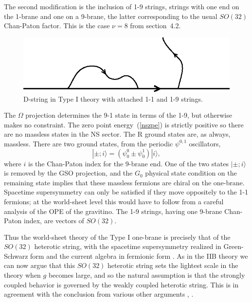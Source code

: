 \documentclass[12pt]{article}
\def\be{\begin{equation}}
\def\ee{\end{equation}}
\begin{document}
The second modification is the inclusion of 1-9 strings, strings with
one end on the 1-brane and one on a 9-brane, the latter corresponding
to the usual $SO(32)$ Chan-Paton factor.  This is the case $\nu = 8$ from
section~4.2.
\begin{figure}
\begin{center}
\leavevmode
\includegraphics{dstring.eps}
\end{center}
\caption[]{D-string in Type I theory with attached 1-1 and 1-9 strings.}
\end{figure}
The $\Omega$
projection determines the 9-1 state in terms of the 1-9, but
otherwise makes no constraint.  The zero point energy~(\ref{nszpe}) is
strictly positive so there are no massless states in the NS
sector.  The R ground states are, as always, massless.  There are two ground
states, from the periodic
$\psi^{0,1}$ oscillators, 
\be
|\pm; i\rangle = ( \psi^0_0 \pm \psi^1_0 ) |i\rangle,
\ee 
where $i$ is the Chan-Paton index for the 9-brane end.  One of the two
states
$|\pm; i\rangle$ is removed by the GSO projection, and the $G_0$ physical
state condition on the remaining state implies that these massless fermions
are chiral on the one-brane.  Spacetime supersymmetry can only be
satisfied if they move oppositely to the 1-1 fermions; at the world-sheet
level this would have to follow from a careful analysis of the OPE of the
gravitino. The 1-9 strings, having one 9-brane
Chan-Paton index, are vectors of $SO(32)$.

Thus the world-sheet theory of the Type I one-brane is precisely that of
the $SO(32)$ heterotic string, 
with the spacetime supersymmetry realized in Green-Schwarz form and the
current algebra in fermionic form \cite{polwit}.  As in the IIB theory we can
now argue that this $SO(32)$ heterotic string sets the lightest scale in the
theory when $g$ becomes large, and so the natural assumption is that the
strongly coupled behavior is governed by the weakly coupled heterotic
string.  This is in agreement with the conclusion from various other
arguments \cite{wit}, \cite{blackone}.
\end{document}
